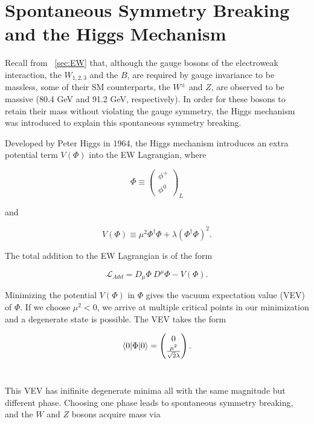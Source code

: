 \section{Spontaneous Symmetry Breaking and the Higgs Mechanism}

Recall from ~\ref{sec:EW} that, although the gauge bosons of the electroweak interaction, the $W_{1,2,3}$ and the $B$, are required by gauge invariance to be massless, some of their SM counterparts, the $W^{\pm}$ and $Z$, are observed to be massive (80.4 GeV and 91.2 GeV, respectively). In order for these bosons to retain their mass without violating the gauge symmetry, the Higgs mechanism was introduced to explain this spontaneous symmetry breaking.

Developed by Peter Higgs in 1964, the Higgs mechanism introduces an extra potential term $V(\Phi)$ into the EW Lagrangian, where 

\begin{equation}
\Phi \equiv \begin{pmatrix}\phi^{+} \\ \phi^{0}\end{pmatrix}_{L}
\end{equation}

\noindent and

\begin{equation}
V(\Phi) \equiv \mu^{2}\Phi^{\dagger}\Phi + \lambda\left(\Phi^{\dagger}\Phi\right)^{2}.
\end{equation}

\noindent The total addition to the EW Lagrangian is of the form

\begin{equation}
\mathcal{L}_{Add} = D_{\mu}\Phi\ D^{\mu}\Phi - V(\Phi).
\end{equation}

Minimizing the potential $V(\Phi)$ in $\Phi$ gives the vacuum expectation value (VEV) of $\Phi$. If we choose $\mu^{2} < 0$, we arrive at multiple critical points in our minimization and a degenerate state is possible. The VEV takes the form

\begin{equation}
\braket{0|\Phi|0} = \begin{pmatrix}0 \\ \frac{\mu^{2}}{\sqrt{2}\lambda}\end{pmatrix}.
\end{equation}~\cite{srednicki}

This VEV has inifinite degenerate minima all with the same magnitude but different phase. Choosing one phase leads to spontaneous symmetry breaking, and the $W$ and $Z$ bosons acquire mass via\cite{halzen}

